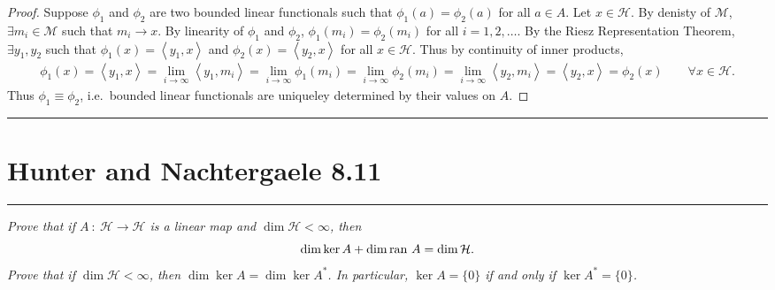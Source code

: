 \documentclass{article} %
\theoremstyle{plain}
\newcommand{\VEC}[2]{\left\langle #1, #2 \right\rangle}
\newcommand{\ran}{\text{\rm ran }}
\newcommand{\problem}[1]{
\vspace{.375cm}
\begin{minipage}{\textwidth}
    \begin{center}
        \noindent\rule{5cm}{1pt}
    \end{center}
    \section{\bf #1}
    \begin{center}
        \noindent\rule{5cm}{1pt}
    \end{center}
    \vspace{0.25cm}
\end{minipage}
}
\numberwithin{equation}{section} %
\numberwithin{figure}{section} %
\numberwithin{table}{section} %
\begin{document}
\begin{proof}
    Suppose $\phi_1$ and $\phi_2$ are two bounded linear functionals such that $\phi_1(a) = \phi_2(a)$ for all $a \in A$.  Let $x \in \mathcal{H}$.  By denisty of $\mathcal{M}$, $\exists m_i \in \mathcal{M}$ such that $m_i \rightarrow x$.  By linearity of $\phi_1$ and $\phi_2$, $\phi_1(m_i) = \phi_2(m_i)$ for all $i = 1, 2, \dots$.  By the Riesz Representation Theorem, $\exists y_1, y_2$ such that $\phi_1(x) = \VEC{y_1}{x}$ and $\phi_2(x) = \VEC{y_2}{x}$ for all $x \in \mathcal{H}$.  Thus by continuity of inner products,
    \begin{align*}
        \phi_1(x) = \VEC{y_1}{x} = \lim_{i\rightarrow \infty}\VEC{y_1}{m_i} = \lim_{i\rightarrow \infty}\phi_1(m_i) = \lim_{i \rightarrow \infty}\phi_2(m_i) = \lim_{i \rightarrow \infty}\VEC{y_2}{m_i} = \VEC{y_2}{x} = \phi_2(x) \qquad \forall x \in \mathcal{H}.
    \end{align*}
    Thus $\phi_1 \equiv \phi_2$, i.e.~bounded linear functionals are uniqueley determined by their values on $A$.
\end{proof}










\problem{Hunter and Nachtergaele 8.11}
\emph{Prove that if $A\ :\ \mathcal{H} \rightarrow \mathcal{H}$ is a linear map and $\dim \mathcal{H} < \infty$, then $$\dim \ker A + \dim \ran A = \dim \mathcal{H}.$$  Prove that if $\dim \mathcal{H} < \infty$, then $\dim \ker A = \dim \ker A^*$.  In particular, $\ker A = \{0\}$ if and only if $\ker A^* = \{0\}$.} \\
\end{document}
